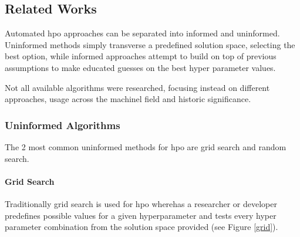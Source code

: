 
\subsection{Related Works}

Automated \acrshort{hpo} approaches can be separated into informed and uninformed. Uninformed methods simply transverse a predefined solution space, selecting the best option, while informed approaches attempt to build on top of previous assumptions to make educated guesses on the best hyper parameter values.

Not all available algorithms were researched, focusing instead on different approaches, usage across the \acrshort{machinel} field and historic significance.

\subsubsection{Uninformed Algorithms}

The 2 most common uninformed methods for \acrshort{hpo} are grid search and random search.

\paragraph{Grid Search}
Traditionally grid search is used for \acrshort{hpo} \parencite{liashchynskyi2019grid} wherehas a researcher or developer predefines possible values for a given hyperparameter and tests every hyper parameter combination from the solution space provided (see Figure \ref{grid}).

